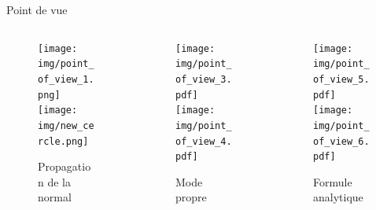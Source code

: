 \begin{frame}{Point de vue}
    \vspace{-0.35cm}
    \begin{columns}
        \begin{column}{0.33\textwidth}
            \centering
            \begin{figure}
                \centering
                \texttt{[image: img/point\_of\_view\_1.png]}\\\vspace{0.1cm}
                \texttt{[image: img/new\_cercle.png]}
                \caption{Propagation de la normal}
            \end{figure}
        \end{column}
        \begin{column}{0.33\textwidth}
            \centering
            \begin{figure}
                \centering\texttt{[image: img/point\_of\_view\_3.pdf]}\\\vspace{0.2cm}
            \texttt{[image: img/point\_of\_view\_4.pdf]}
                \caption{Mode propre}
            \end{figure}

        \end{column}
        \begin{column}{0.33\textwidth}
            \centering
            \begin{figure}
                \centering
            \texttt{[image: img/point\_of\_view\_5.pdf]}\\\vspace{0.1cm
            }
            \texttt{[image: img/point\_of\_view\_6.pdf]}
                \caption{Formule analytique}
            \end{figure}
        \end{column}
    \end{columns}
\end{frame}

